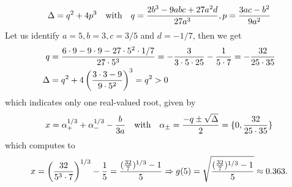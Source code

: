 \documentclass[smallabstract,smallcaptions]{dccpaper}
\newif\ifarxiv\arxivfalse
\begin{document}
%
\begin{align}
  \Delta=q^2+4p^3 \quad\text{with}\quad q=\frac{2b^3-9abc+27a^2d}{27a^3},p=\frac{3ac-b^2}{9a^2}
\end{align}
%
Let us identify $a=5,b=3,c=3/5$ and $d=-1/7$, then we get
%
\begin{align}
  q&=\frac{6\cdot 9-9\cdot 9 - 27\cdot 5^2\cdot1/7}{27\cdot 5^3}
  =-\frac{3}{3\cdot 5\cdot 25} -\frac{1}{5\cdot 7}=-\frac{32}{25\cdot35}\\
  \Delta&=q^2 + 4 \left(\frac{3\cdot 3 -9}{9\cdot 5^2}\right)^3=q^2>0
\end{align}
%
which indicates only one real-valued root, given by
%
\begin{align}
  x=\alpha_+^{1/3}+\alpha_-^{1/3}-\frac{b}{3a} 
  \quad\text{with}\quad  \alpha_{\pm}=\frac{-q\pm\sqrt{\Delta}}{2} = \{0, \frac{32}{25\cdot 35} \}
\end{align}
%
which computes to
%
\begin{align}
  x=\left( \frac{32}{5^3\cdot 7}\right)^{1/3}- \frac{1}{5}
  =\frac{(\frac{32}{7})^{1/3}-1}{5} \Rightarrow g(5)=\sqrt{\frac{(\frac{32}{7})^{1/3}-1}{5}} \approx 0.363.
\end{align}
%
\fi %


\ifarxiv%
%
\end{document}
